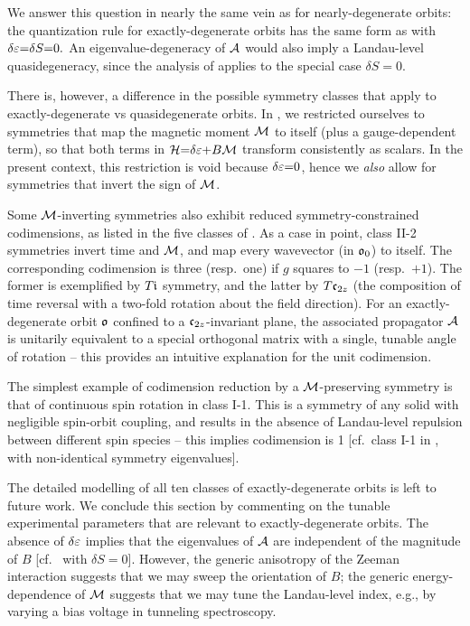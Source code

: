 \documentclass[aps, showpacs, twocolumn, notitlepage, superscriptaddress]{revtex4-1}
\begin{document}
We answer this question in nearly the same vein as for nearly-degenerate orbits: the quantization rule for exactly-degenerate orbits\cite{topoferm} has the same form as  with $\delta \varepsilon{=}\delta S{=}0.$ An eigenvalue-degeneracy of ${\cal A}$ would also imply a Landau-level quasidegeneracy, since the analysis of  applies to the special case $\delta S{=}0$. 

There is, however, a difference in the possible symmetry classes that apply to exactly-degenerate vs quasidegenerate orbits.  In , we restricted ourselves to symmetries  that map the magnetic moment  ${\cal M}$ to itself (plus a gauge-dependent term\cite{100p}), so that both terms in ${\cal H}{=}\delta \varepsilon{+}B{\cal M}$ transform consistently as scalars. In the present context, this restriction is void because $\delta\varepsilon{=}0$, hence we \textit{also} allow for symmetries that invert the sign of ${\cal M}$. 

Some ${\cal M}$-inverting symmetries also exhibit reduced symmetry-constrained codimensions, as listed in the five classes of . As a case in point, class II-2 symmetries invert time and ${\cal M}$, and map every wavevector (in $\mathfrak{o}_0$) to itself. The corresponding codimension is three (resp.\ one) if $g$ squares to $-1$ (resp.\ $+1$). The former is exemplified by $T\mathfrak{i}$ symmetry, and the latter by $T\mathfrak{c}_{2z}$ (the composition of time reversal with a two-fold rotation about the field direction). For an exactly-degenerate orbit $\mathfrak{o}$ confined to a $\mathfrak{c}_{2z}$-invariant plane, the associated propagator ${\cal A}$ is unitarily equivalent to a special orthogonal matrix\cite{100p,alexandradinata_berry-phase_2016} with a single, tunable angle of rotation -- this provides an intuitive explanation for the unit codimension.

The simplest example of codimension reduction by a ${\cal M}$-preserving symmetry is that of continuous spin rotation in class I-1. This is a symmetry of any solid with negligible spin-orbit coupling, and results in the absence of Landau-level repulsion between different spin species -- this implies codimension is 1 [cf.\ class I-1 in , with non-identical symmetry eigenvalues].

The detailed modelling of all ten classes of exactly-degenerate orbits is left to future work. We conclude this section by commenting on the tunable experimental parameters that are relevant to exactly-degenerate orbits. The absence of $\delta\varepsilon$  implies that the eigenvalues of ${\cal A}$ are independent of the magnitude of $B$ [cf.\  with $\delta S{=}0$]. However, the generic anisotropy of the Zeeman interaction suggests that we may sweep the orientation of $B$; the generic energy-dependence of ${\cal M}$ suggests that we may tune the Landau-level index, e.g., by varying a bias voltage in tunneling spectroscopy.
\end{document}
